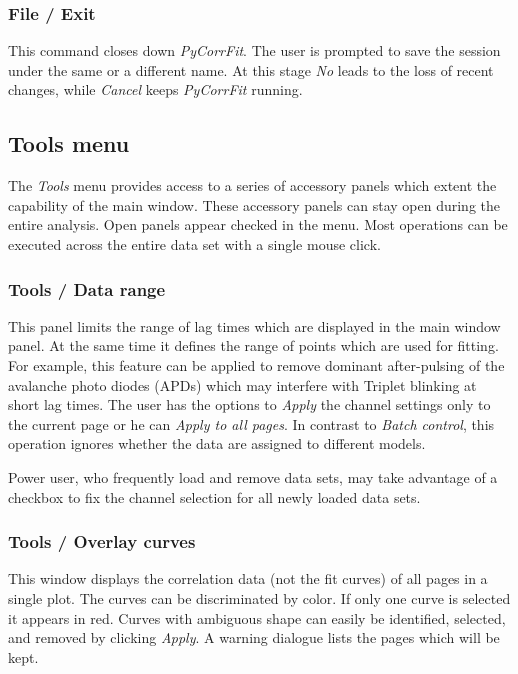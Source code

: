\subsubsection{File / Exit}
\label{sec:fm.e}
This command closes down \textit{PyCorrFit}. The user is prompted to save the session under the same or a different name. At this stage \textit{No} leads to the loss of recent changes, while \textit{Cancel} keeps \textit{PyCorrFit} running.

\subsection{Tools menu}
\label{sec:tm}
The \textit{Tools} menu provides access to a series of accessory panels which extent the capability of the main window. These accessory panels can stay open during the entire analysis. Open panels appear checked in the menu. Most operations can be executed across the entire data set with a single mouse click. 

\subsubsection{Tools / Data range}
\label{sec:tm.dr}
This panel limits the range of lag times which are displayed in the main window panel. At the same time it defines the range of points which are used for fitting. For example, this feature can be applied to remove dominant after-pulsing of the avalanche photo diodes (APDs) which may interfere with Triplet blinking at short lag times. The user has the options to \textit{Apply} the channel settings only to the current page or he can \textit{Apply to all pages}. In contrast to \textit{Batch control}, this operation ignores whether the data are assigned to different models. 

Power user, who frequently load and remove data sets, may take advantage of a checkbox to fix the channel selection for all newly loaded data sets.

\subsubsection{Tools / Overlay curves}
\label{sec:tm.oc}
This window displays the correlation data (not the fit curves) of all pages in a single plot. The curves can be discriminated by color. If only one curve is selected it appears in red. Curves with ambiguous shape can easily be identified, selected, and removed by clicking \textit{Apply}. A warning dialogue lists the pages which will be kept.

